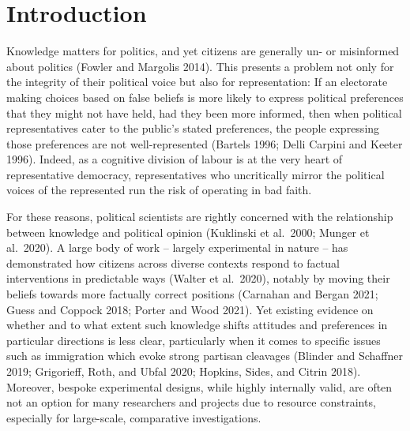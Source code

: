 \documentclass[12pt,halfline,a4paper,]{ouparticle}
\begin{document}
\date{\today}


\maketitle



\hypertarget{introduction}{%
\section{Introduction}\label{introduction}}

Knowledge matters for politics, and yet citizens are generally un- or
misinformed about politics (Fowler and Margolis 2014). This presents a
problem not only for the integrity of their political voice but also for
representation: If an electorate making choices based on false beliefs
is more likely to express political preferences that they might not have
held, had they been more informed, then when political representatives
cater to the public's stated preferences, the people expressing those
preferences are not well-represented (Bartels 1996; Delli Carpini and
Keeter 1996). Indeed, as a cognitive division of labour is at the very
heart of representative democracy, representatives who uncritically
mirror the political voices of the represented run the risk of operating
in bad faith.

For these reasons, political scientists are rightly concerned with the
relationship between knowledge and political opinion (Kuklinski et
al.~2000; Munger et al.~2020). A large body of work -- largely
experimental in nature -- has demonstrated how citizens across diverse
contexts respond to factual interventions in predictable ways (Walter et
al.~2020), notably by moving their beliefs towards more factually
correct positions (Carnahan and Bergan 2021; Guess and Coppock 2018;
Porter and Wood 2021). Yet existing evidence on whether and to what
extent such knowledge shifts attitudes and preferences in particular
directions is less clear, particularly when it comes to specific issues
such as immigration which evoke strong partisan cleavages (Blinder and
Schaffner 2019; Grigorieff, Roth, and Ubfal 2020; Hopkins, Sides, and
Citrin 2018). Moreover, bespoke experimental designs, while highly
internally valid, are often not an option for many researchers and
projects due to resource constraints, especially for large-scale,
comparative investigations.
\end{document}

